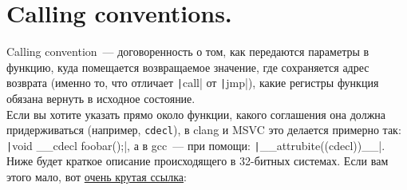 \documentclass{article}
\begin{document}
    \section{Calling conventions.}
    Calling convention~--- договоренность о том, как передаются параметры в функцию, куда помещается возвращаемое значение, где сохраняется адрес возврата (именно то, что отличает \texttt|call| от \texttt|jmp|), какие регистры функция обязана вернуть в исходное состояние.\\
    Если вы хотите указать прямо около функции, какого соглашения она должна придерживаться (например, \Verb|cdecl|), в clang и MSVC это делается примерно так: \texttt|void __cdecl foobar();|, а в gcc~--- при помощи: \texttt|__attrubite((cdecl))__|.\\
    Ниже будет краткое описание происходящего в 32-битных системах. Если вам этого мало, вот \href{https://www.agner.org/optimize/calling_conventions.pdf}{очень крутая ссылка}:
\end{document}
